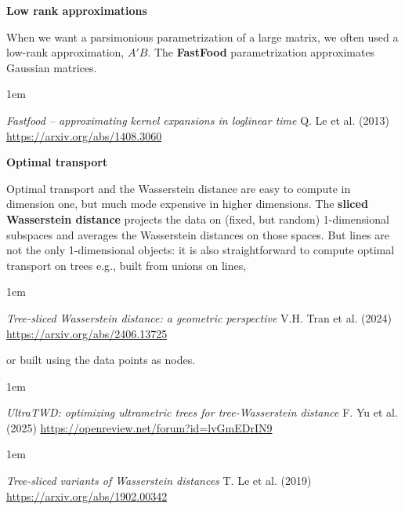 \documentclass[a5paper]{article}
\let\d\textbf
\newenvironment{reference}{%
  \medskip\goodbreak
  \parskip 0pt
  \raggedright
  \leftskip 1em
  \obeylines
}{\par\medskip\goodbreak}
\def\subsection#1{{\par\bigskip\goodbreak\large\bfseries #1\par}}
\begin{document}
\subsection{Low rank approximations}

When we want a parsimonious parametrization of a large matrix,
we often used a low-rank approximation, $A'B$.
The \d{FastFood} parametrization approximates Gaussian matrices.

\begin{reference}
  \emph{Fastfood -- approximating kernel expansions in loglinear time}
  Q. Le et al. (2013)
  \url{https://arxiv.org/abs/1408.3060}
\end{reference}

\subsection{Optimal transport}

Optimal transport and the Wasserstein distance are easy to compute in dimension one,
but much mode expensive in higher dimensions.
The \d{sliced Wasserstein distance} projects the data on (fixed, but random)
1-dimensional subspaces and averages the Wasserstein distances on those spaces.
But lines are not the only 1-dimensional objects: it is also straightforward to
compute optimal transport on trees
e.g., built from unions on lines,

\begin{reference}
  \emph{Tree-sliced Wasserstein distance: a geometric perspective}
  V.H. Tran et al. (2024)
  \url{https://arxiv.org/abs/2406.13725}
\end{reference}

or built using the data points as nodes.

\begin{reference}
  \emph{UltraTWD: optimizing ultrametric trees for tree-Wasserstein distance}
  F. Yu et al. (2025)
  \url{https://openreview.net/forum?id=lvGmEDrIN9}
\end{reference}

\begin{reference}
  \emph{Tree-sliced variants of Wasserstein distances}
  T. Le et al. (2019)
  \url{https://arxiv.org/abs/1902.00342}
\end{reference}
\end{document}
